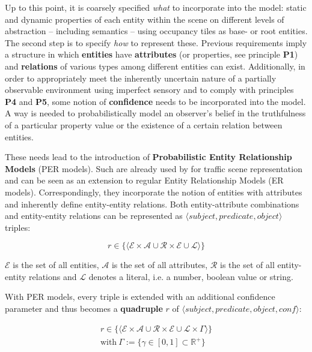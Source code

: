 Up to this point, it is coarsely specified \textit{what} to incorporate into the model: static and dynamic properties of each entity within the scene on different levels of abstraction – including semantics – using occupancy tiles as base- or root entities. The second step is to specify \textit{how} to represent these. Previous requirements imply a structure in which \textbf{entities} have \textbf{attributes} (or properties, see principle \textbf{P1}) and \textbf{relations} of various types among different entities can exist. Additionally, in order to appropriately meet the inherently uncertain nature of a partially observable environment using imperfect sensory and to comply with principles \textbf{P4} and \textbf{P5}, some notion of \textbf{confidence} needs to be incorporated into the model. A way is needed to probabilistically model an observer's belief in the truthfulness of a particular property value or the existence of a certain relation between entities. 

These needs lead to the introduction of \textbf{Probabilistic Entity Relationship Models} (PER models). Such are already used by \cite{Petrich2018} for traffic scene representation and can be seen as an extension to regular Entity Relationship Models (ER models). Correspondingly, they incorporate the notion of entities with attributes and inherently define entity-entity relations. Both entity-attribute combinations and entity-entity relations can be represented as $\langle subject, predicate, object \rangle$ triples:

$$r \in \{ \langle \mathcal{E} \times \mathcal{A} \cup \mathcal{R} \times \mathcal{E} \cup \mathcal{L} \rangle \}$$

$\mathcal{E}$ is the set of all entities, $\mathcal{A}$ is the set of all attributes, $\mathcal{R}$ is the set of all entity-entity relations and $\mathcal{L}$ denotes a literal, i.e. a number, boolean value or string.

With PER models, every triple is extended with an additional confidence parameter and thus becomes a \textbf{quadruple} $r$ of $\langle subject, predicate, object, \textit{conf} \rangle$: 

\begin{gather*}
	r \in \{ \langle \mathcal{E} \times \mathcal{A} \cup \mathcal{R} \times \mathcal{E} \cup \mathcal{L} \times \Gamma \rangle \} \\
	\text{with} \  \Gamma := \{ \gamma \in [0, 1] \subset \mathbb{R}^+ \} \\
\end{gather*}

